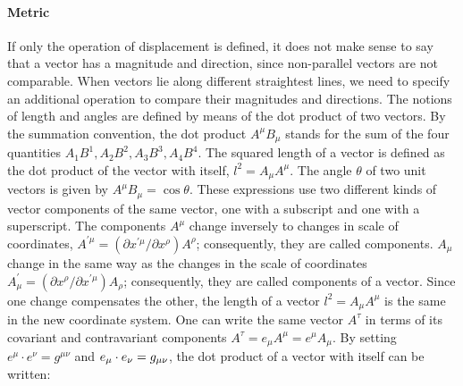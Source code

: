 \documentclass[final]{article}
\begin{document}
\paragraph{Metric} If only the operation of displacement is defined, it does not make sense to say that a vector has a magnitude and direction, since non-parallel vectors are not comparable. When vectors lie along different straightest lines, we need to specify an additional operation to compare their magnitudes and directions. The notions of length and angles are defined by means of the dot product of two vectors. By the summation convention, the dot product $A^\mu B_\mu$ stands for the sum of the four quantities $A_{1} B^{1}, A_{2} B^{2}, A_{3} B^{3}, A_{4} B^{4}$. The squared length of a vector is defined as the dot product of the vector with itself, $l^2 = A_{\mu} A^{\mu}$. The angle $\theta$ of two unit vectors is given by $A^\mu B_\mu = \cos{\theta}$. These expressions use two different kinds of vector components of the same vector, one with a subscript and one with a superscript. The components $A^\mu$ change inversely to changes in scale of coordinates, $A^{\prime \mu}=\left(\partial x^{\prime \mu} / \partial x^{\rho}\right) A^{\rho}$; consequently, they are called  components. $A_\mu$ change in the same way as the changes in the scale of coordinates $A_{\mu}^{\prime}=\left(\partial x^{\rho} / \partial x^{\prime \mu}\right) A_{\rho}$; consequently, they are called  components of a vector. Since one change compensates the other, the length of a vector $l^2 = A_{\mu} A^{\mu}$ is the same in the new coordinate system. One can write the same vector $A^\tau$ in terms of its covariant and contravariant components $A^\tau= e_\mu A^\mu = e^\mu A_\mu$. By setting $e^\mu \cdot e^\nu = g^{\mu\nu}$ and $e_\mu \cdot e_\nu = g_{\mu\nu}$, the dot product of a vector with itself can be written:
 
\end{document}
